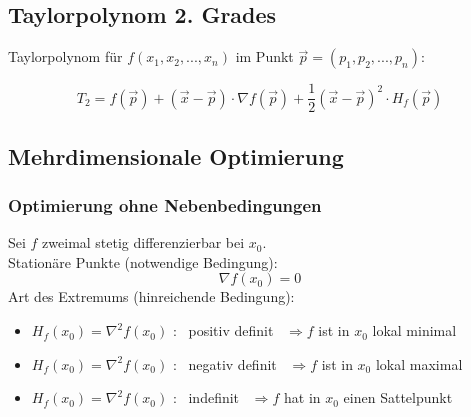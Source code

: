 \subsection{Taylorpolynom 2. Grades} %
\label{sub:taylorpolynom_2_grades}

Taylorpolynom für $f(x_1,x_2,...,x_n)$ im Punkt $\overrightarrow{p} = (p_1,p_2,...,p_n)$:

\begin{equation}
	T_2 = f(\overrightarrow{p}) + (\overrightarrow{x}-\overrightarrow{p}) \cdot \nabla f(\overrightarrow{p})+\frac{1}{2}
	(\overrightarrow{x}-\overrightarrow{p})^2 \cdot H_f(\overrightarrow{p})
\end{equation}

\subsection{Mehrdimensionale Optimierung} %
\label{sub:mehrdimensionale_optimierung}

\subsubsection{Optimierung ohne Nebenbedingungen} %
\label{ssub:optimierung_ohne_nebenbedingungen}
Sei $f$ zweimal stetig differenzierbar bei $x_0$.
\\Stationäre Punkte (notwendige Bedingung):
\begin{equation}
	\nabla f (x_0) = 0
\end{equation}
Art des Extremums (hinreichende Bedingung):

\begin{itemize}
	\item $H_f(x_0) = \nabla^2f(x_0)$ : \ positiv definit \  $\Rightarrow f $ ist in $ x_0 $ lokal minimal
	\item $H_f(x_0) = \nabla^2f(x_0)$ : \ negativ definit \  $\Rightarrow f $ ist in $ x_0 $ lokal maximal
	\item $H_f(x_0) = \nabla^2f(x_0)$ : \ indefinit \ $\Rightarrow f $ hat in $ x_0 $ einen Sattelpunkt
\end{itemize}

